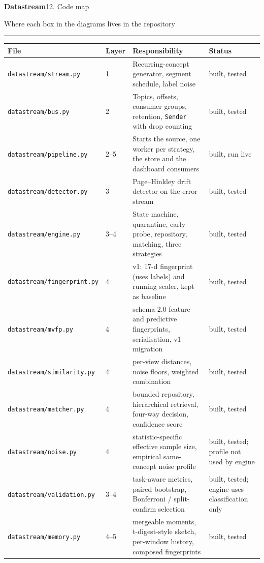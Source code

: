 \documentclass[10pt]{article}
\newcommand{\pagetitle}[2]{%
  {\Huge\bfseries Datastream}\hfill{\large #1}\par\vspace{2pt}
  {\large\color{ink!70} #2}\par\vspace{8pt}\hrule\vspace{14pt}}
\begin{document}
\pagetitle{12. Code map}{Where each box in the diagrams lives in the repository}
\renewcommand{\arraystretch}{1.5}
\begin{tabular}{@{}p{6.2cm}p{2.2cm}p{20cm}p{3.6cm}@{}}
\toprule
\textbf{File} & \textbf{Layer} & \textbf{Responsibility} & \textbf{Status}\\
\midrule
\texttt{datastream/stream.py} & 1 & Recurring-concept generator, segment schedule, label noise & \textcolor{okline}{built, tested}\\
\texttt{datastream/bus.py} & 2 & Topics, offsets, consumer groups, retention, \texttt{Sender} with drop counting & \textcolor{okline}{built, tested}\\
\texttt{datastream/pipeline.py} & 2--5 & Starts the source, one worker per strategy, the store and the dashboard consumers & \textcolor{okline}{built, run live}\\
\texttt{datastream/detector.py} & 3 & Page--Hinkley drift detector on the error stream & \textcolor{okline}{built, tested}\\
\texttt{datastream/engine.py} & 3--4 & State machine, quarantine, early probe, repository, matching, three strategies & \textcolor{okline}{built, tested}\\
\texttt{datastream/fingerprint.py} & 4 & v1: 17-d fingerprint (uses labels) and running scaler, kept as baseline & \textcolor{okline}{built, tested}\\
\texttt{datastream/mvfp.py} & 4 & schema 2.0 feature and predictive fingerprints, serialisation, v1 migration & \textcolor{okline}{built, tested}\\
\texttt{datastream/similarity.py} & 4 & per-view distances, noise floors, weighted combination & \textcolor{okline}{built, tested}\\
\texttt{datastream/matcher.py} & 4 & bounded repository, hierarchical retrieval, four-way decision, confidence score & \textcolor{okline}{built, tested}\\
\texttt{datastream/noise.py} & 4 & statistic-specific effective sample size, empirical same-concept noise profile & \textcolor{okline}{built, tested; profile not used by engine}\\
\texttt{datastream/validation.py} & 3--4 & task-aware metrics, paired bootstrap, Bonferroni / split-confirm selection & \textcolor{okline}{built, tested; engine uses classification only}\\
\texttt{datastream/memory.py} & 4--5 & mergeable moments, t-digest-style sketch, per-window history, composed fingerprints & \textcolor{okline}{built, tested}\\

\end{tabular}
\end{document}
